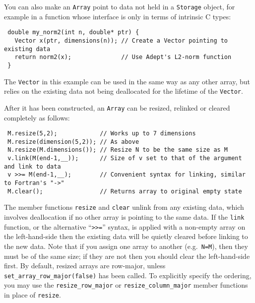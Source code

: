 \documentclass[a4,oneside]{book}
\def\codesize{\small}
\def\code#1{{\codesize\texttt{#1}}}
\begin{document}
You can also make an \code{Array} point to data not held in a
\code{Storage} object, for example in a function whose interface is
only in terms of intrinsic C types:
\begin{lstlisting}
 double my_norm2(int n, double* ptr) {
   Vector x(ptr, dimensions(n)); // Create a Vector pointing to existing data
   return norm2(x);              // Use Adept's L2-norm function
 }
\end{lstlisting}
The \code{Vector} in this example can be used in the same way as any
other array, but relies on the existing data not being deallocated for
the lifetime of the \code{Vector}.

After it has been constructed, an \code{Array} can be resized,
relinked or cleared completely as follows:
\begin{lstlisting}
 M.resize(5,2);            // Works up to 7 dimensions
 M.resize(dimension(5,2)); // As above
 N.resize(M.dimensions()); // Resize N to be the same size as M
 v.link(M(end-1,__));      // Size of v set to that of the argument and link to data
 v >>= M(end-1,__);        // Convenient syntax for linking, similar to Fortran's "->"
 M.clear();                // Returns array to original empty state
\end{lstlisting}
The member functions \code{resize} and \code{clear} unlink from any
existing data, which involves deallocation if no other array is
pointing to the same data. If the \code{link} function, or the
alternative ``\code{>>=}'' syntax, is applied with a non-empty array
on the left-hand-side then the existing data will be quietly cleared
before linking to the new data. Note that if you assign one array to
another (e.g.\ \code{N=M}), then they must be of the same size; if
they are not then you should clear the left-hand-side first. By
default, resized arrays are row-major, unless
\code{set\_array\_row\_major(false)} has been called. To explicitly
specify the ordering, you may use the \code{resize\_row\_major} or
\code{resize\_column\_major} member functions in place of
\code{resize}.
\end{document}
